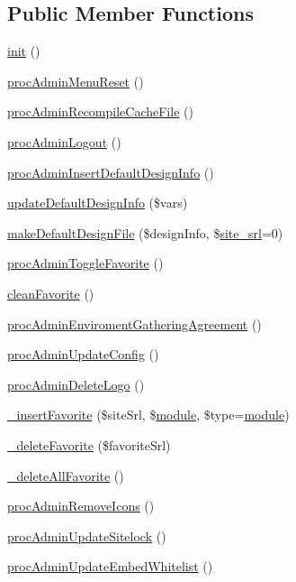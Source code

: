 \subsection*{Public Member Functions}
\begin{DoxyCompactItemize}
\item 
\hyperlink{classadminAdminController_abfceebf69c8870ad40dcb1714a6aae0e}{init} ()
\item 
\hyperlink{classadminAdminController_a0ba2a344a960ba3fa385f8450233cd32}{proc\+Admin\+Menu\+Reset} ()
\item 
\hyperlink{classadminAdminController_a15f6aab1393b491c9f754af46929fee7}{proc\+Admin\+Recompile\+Cache\+File} ()
\item 
\hyperlink{classadminAdminController_af49660a64f4b64c0b2f0801f4742abd1}{proc\+Admin\+Logout} ()
\item 
\hyperlink{classadminAdminController_ab0b62d09b5f73640ab9a7a7c5a58e579}{proc\+Admin\+Insert\+Default\+Design\+Info} ()
\item 
\hyperlink{classadminAdminController_ab0f984cd55d52455a818323404efb974}{update\+Default\+Design\+Info} (\$vars)
\item 
\hyperlink{classadminAdminController_a70c3ce620fc0791bb2acec0a9dedcc74}{make\+Default\+Design\+File} (\$design\+Info, \$\hyperlink{ko_8install_8php_a8b1406b4ad1048041558dce6bfe89004}{site\+\_\+srl}=0)
\item 
\hyperlink{classadminAdminController_ab7075e4e561ebf87b4d06418638d52ab}{proc\+Admin\+Toggle\+Favorite} ()
\item 
\hyperlink{classadminAdminController_a774b7d9260572f5d6391adc624e6b810}{clean\+Favorite} ()
\item 
\hyperlink{classadminAdminController_a8ef62179d5114d3d718846179d907bf0}{proc\+Admin\+Enviroment\+Gathering\+Agreement} ()
\item 
\hyperlink{classadminAdminController_a720735446257b930dce48d07c4ac9e4e}{proc\+Admin\+Update\+Config} ()
\item 
\hyperlink{classadminAdminController_a603a7e8aca1d391d61599b8db4ef2ccb}{proc\+Admin\+Delete\+Logo} ()
\item 
\hyperlink{classadminAdminController_ac8d650e27693beb7fc6814eb5e982f28}{\+\_\+insert\+Favorite} (\$site\+Srl, \$\hyperlink{classmodule}{module}, \$type=\textquotesingle{}\hyperlink{classmodule}{module}\textquotesingle{})
\item 
\hyperlink{classadminAdminController_aeaf185ff2307ca6fcccaf1589b25bc6f}{\+\_\+delete\+Favorite} (\$favorite\+Srl)
\item 
\hyperlink{classadminAdminController_af03754d231177ae0326f0cc262dd6dd7}{\+\_\+delete\+All\+Favorite} ()
\item 
\hyperlink{classadminAdminController_a9ddaddf87c06a8ef329ddc0d4305f5d1}{proc\+Admin\+Remove\+Icons} ()
\item 
\hyperlink{classadminAdminController_a4bbc5bf3f60f108c82b373b4b6fbf8a1}{proc\+Admin\+Update\+Sitelock} ()
\item 
\hyperlink{classadminAdminController_aff36b4021e19ccb44ab87043faf13b1a}{proc\+Admin\+Update\+Embed\+Whitelist} ()
\end{DoxyCompactItemize}
